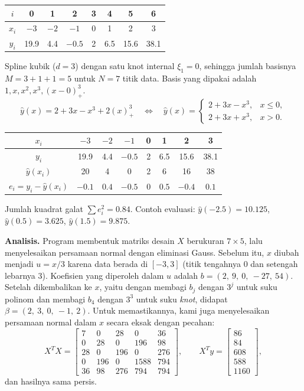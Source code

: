 \begin{kasus}
\begin{center}
\begin{tabular}{c|ccccccc}
$i$   & 0 & 1 & 2 & 3 & 4 & 5 & 6 \\ \hline
$x_i$ & $-3$ & $-2$ & $-1$ & 0 & 1 & 2 & 3 \\
$y_i$ & 19.9 & 4.4 & $-0.5$ & 2 & 6.5 & 15.6 & 38.1
\end{tabular}
\end{center}
Spline kubik ($d = 3$) dengan satu knot internal $\xi_1 = 0$, sehingga jumlah basisnya $M = 3 + 1 + 1 = 5$ untuk $N = 7$ titik data. Basis yang dipakai adalah $1, x, x^2, x^3, (x - 0)_+^3$.
\[
\hat y(x) = 2 + 3x - x^3 + 2(x)_+^3
\quad\Longleftrightarrow\quad
\hat y(x) =
\begin{cases}
2 + 3x - x^3, & x \le 0,\\
2 + 3x + x^3, & x > 0.
\end{cases}
\]
\begin{center}
\begin{tabular}{c|ccccccc}
$x_i$ & $-3$ & $-2$ & $-1$ & 0 & 1 & 2 & 3 \\ \hline
$y_i$ & 19.9 & 4.4 & $-0.5$ & 2 & 6.5 & 15.6 & 38.1 \\
$\hat y(x_i)$ & 20 & 4 & 0 & 2 & 6 & 16 & 38 \\
$e_i = y_i - \hat y(x_i)$ & $-0.1$ & $0.4$ & $-0.5$ & $0$ & $0.5$ & $-0.4$ & $0.1$
\end{tabular}
\end{center}
Jumlah kuadrat galat $\sum e_i^2 = 0.84$. Contoh evaluasi: $\hat y(-2.5) = 10.125$, $\hat y(0.5) = 3.625$, $\hat y(1.5) = 9.875$.
\end{kasus}

\textbf{Analisis.} Program membentuk matriks desain $X$ berukuran $7 \times 5$, lalu menyelesaikan persamaan normal dengan eliminasi Gauss. Sebelum itu, $x$ diubah menjadi $u = x/3$ karena data berada di $[-3, 3]$ (titik tengahnya 0 dan setengah lebarnya 3). Koefisien yang diperoleh dalam $u$ adalah $b = (2,\ 9,\ 0,\ -27,\ 54)$. Setelah dikembalikan ke $x$, yaitu dengan membagi $b_j$ dengan $3^j$ untuk suku polinom dan membagi $b_4$ dengan $3^3$ untuk suku \textit{knot}, didapat $\beta = (2,\ 3,\ 0,\ -1,\ 2)$. Untuk memastikannya, kami juga menyelesaikan persamaan normal dalam $x$ secara eksak dengan pecahan:
\[
X^TX =
\begin{bmatrix}
7 & 0 & 28 & 0 & 36\\
0 & 28 & 0 & 196 & 98\\
28 & 0 & 196 & 0 & 276\\
0 & 196 & 0 & 1588 & 794\\
36 & 98 & 276 & 794 & 794
\end{bmatrix},
\qquad
X^Ty =
\begin{bmatrix} 86\\ 84\\ 608\\ 588\\ 1160 \end{bmatrix},
\]
dan hasilnya sama persis.


